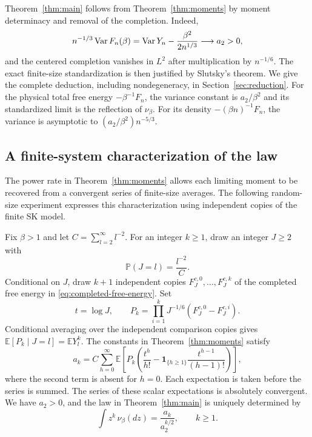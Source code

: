 Theorem~\ref{thm:main} follows from Theorem~\ref{thm:moments} by moment determinacy and removal of the completion. Indeed,
\[
 n^{-1/3}\operatorname{Var} F_n(\beta)
 =\operatorname{Var} Y_n-\frac{\beta^2}{2n^{1/3}}\longrightarrow a_2>0,
\]
and the centered completion vanishes in $L^2$ after multiplication by $n^{-1/6}$. The exact finite-size standardization is then justified by Slutsky's theorem. We give the complete deduction, including nondegeneracy, in Section~\ref{sec:reduction}.
For the physical total free energy $-\beta^{-1}F_n$, the variance
constant is $a_2/\beta^2$ and its standardized limit is the reflection
of $\nu_\beta$. For its density $-(\beta n)^{-1}F_n$, the variance is
asymptotic to $(a_2/\beta^2)n^{-5/3}$.

\subsection{A finite-system characterization of the law}

The power rate in Theorem~\ref{thm:moments} allows each limiting
moment to be recovered from a convergent series of finite-size averages.
The following random-size experiment expresses this characterization
using independent copies of the finite SK model.

\begin{proposition}\label{def:law}
Fix $\beta>1$ and let $C=\sum_{l=2}^{\infty}l^{-2}$. For an integer $k\ge1$, draw an integer $J\ge2$ with
\[
 \mathbb P(J=l)=\frac{l^{-2}}C.
\]
Conditional on $J$, draw $k+1$ independent copies $F_J^{c,0},\ldots,F_J^{c,k}$ of the completed free energy in \eqref{eq:completed-free-energy}. Set
\[
 t=\log J,
 \qquad P_k=\prod_{i=1}^k J^{-1/6}(F_J^{c,0}-F_J^{c,i}).
\]
Conditional averaging over the independent comparison copies gives
$\mathbb E[P_k\mid J=l]=\mathbb E Y_l^k$.
The constants in Theorem~\ref{thm:moments} satisfy
\begin{equation}\label{eq:law-moments}
 a_k=C\sum_{h=0}^{\infty}
 \mathbb E\!\left[P_k\left(\frac{t^h}{h!}
       -\mathbf1_{\{h\ge1\}}\frac{t^{h-1}}{(h-1)!}\right)\right],
\end{equation}
where the second term is absent for $h=0$. Each expectation is taken before the series is summed. The series of these scalar expectations is absolutely convergent. We have $a_2>0$, and the law in Theorem~\ref{thm:main} is uniquely determined by
\[
 \int z^k\,\nu_\beta(dz)=\frac{a_k}{a_2^{k/2}},\qquad k\ge1.
\]
\end{proposition}

